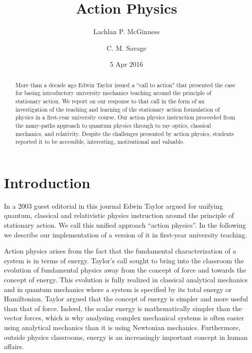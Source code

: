 \documentclass[prb,oncolumn,12pt]{revtex4-2}
\begin{document}
\title{Action Physics}

\author{Lachlan P. McGinness}
\author{C. M. Savage}

\date{5 Apr 2016 }


\begin{abstract}
\medskip
\medskip
More than a decade ago Edwin Taylor issued a ``call to action" that presented the case for basing introductory university mechanics teaching around the principle of stationary action. \cite{Taylor2003} We report on our response to that call in the form of an investigation of the teaching and learning of the stationary action formulation of physics in a first-year university course.  Our action physics instruction proceeded from the many-paths approach to quantum physics through to ray optics, classical mechanics, and relativity. Despite the challenges presented by action physics, students reported it to be accessible, interesting, motivational and valuable. 
\end{abstract}

\maketitle
\newpage

\section{Introduction}
\label{Introduction}
In a 2003 guest editorial in this journal Edwin Taylor argued for unifying quantum, classical and relativistic physics instruction around the principle of stationary action. \cite{Taylor2003} We call this unified approach ``action physics''. In the following we describe our implementation of a version of it in first-year university teaching.

Action physics arises from the fact that the fundamental characterization of a system is in terms of energy. Taylor's call sought to bring into the classroom the evolution of fundamental physics away from the concept of force and towards the concept of energy. \cite{Jammer,Lanczos}  This evolution is fully realized in classical analytical mechanics and in quantum mechanics where a system is specified by its total energy or Hamiltonian. Taylor argued that the concept of energy is simpler and more useful than that of force. Indeed, the scalar energy is mathematically simpler than the vector forces, which is why analysing complex mechanical systems is often easier using analytical mechanics than it is using Newtonian mechanics. Furthermore, outside physics classrooms, energy is an increasingly important concept in human affairs.
\end{document}

